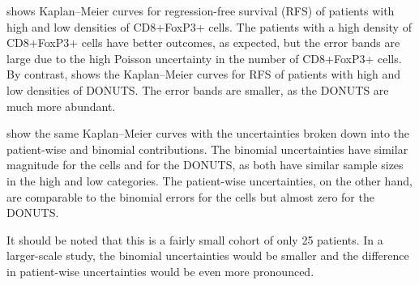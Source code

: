 \documentclass[article]{jss}
\newcommand{\KM}{Kaplan--Meier} %
\begin{document}
 shows \KM{} curves for regression-free survival (RFS) of patients with high and low densities of CD8+FoxP3+ cells.  The patients with a high density of CD8+FoxP3+ cells have better outcomes, as expected, but the error bands are large due to the high Poisson uncertainty in the number of CD8+FoxP3+ cells.  By contrast,  shows the \KM{} curves for RFS of patients with high and low densities of DONUTS\@.  The error bands are smaller, as the DONUTS are much more abundant.

 show the same \KM{} curves with the uncertainties broken down into the patient-wise and binomial contributions.  The binomial uncertainties have similar magnitude for the cells and for the DONUTS, as both have similar sample sizes in the high and low categories.  The patient-wise uncertainties, on the other hand, are comparable to the binomial errors for the cells but almost zero for the DONUTS\@.

It should be noted that this is a fairly small cohort of only 25 patients.  In a larger-scale study, the binomial uncertainties would be smaller and the difference in patient-wise uncertainties would be even more pronounced.
\end{document}
